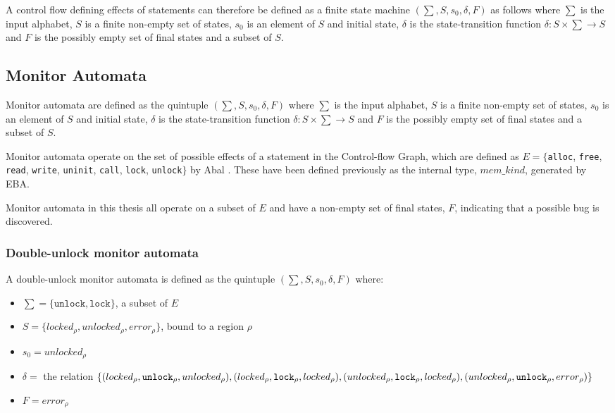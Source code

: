 \newpar A control flow defining effects of statements can therefore be defined as a finite state machine $(\sum, S, s_0, \delta, F)$ as follows where $\sum$ is the input alphabet, $S$ is a finite non-empty set of states, $s_0$ is an element of $S$ and initial state, $\delta$ is the state-transition function $\delta: S \times \sum \rightarrow S$ and $F$ is the possibly empty set of final states and a subset of $S$. 

\subsection{Monitor Automata}
Monitor automata are defined as the quintuple $(\sum, S, s_0, \delta, F)$ where $\sum$ is the input alphabet, $S$ is a finite non-empty set of states, $s_0$ is an element of $S$ and initial state, $\delta$ is the state-transition function $\delta: S \times \sum \rightarrow S$ and $F$ is the possibly empty set of final states and a subset of $S$.

\newpar Monitor automata operate on the set of possible effects of a statement in the Control-flow Graph, which are defined as $E = \{$\texttt{alloc}, \texttt{free}, \texttt{read}, \texttt{write}, \texttt{uninit}, \texttt{call}, \texttt{lock}, \texttt{unlock}$\}$ by Abal \cite{EffectiveBugFinding}. These have been defined previously as the internal type, $mem\_kind$, generated by EBA. 

\newpar Monitor automata in this thesis all operate on a subset of $E$ and have a non-empty set of final states, $F$, indicating that a possible bug is discovered.  

\subsubsection{Double-unlock monitor automata}

A double-unlock monitor automata is defined as the quintuple $(\sum, S, s_0, \delta, F)$ where: 

\begin{itemize}
    \item $\sum = \{\texttt{unlock}, \texttt{lock}\}$, a subset of $E$
    \item $S = \{ locked_\rho, unlocked_\rho, error_\rho \}$, bound to a region $\rho$
    \item $s_0 = unlocked_\rho$ 
    \item $\delta =$ the relation $\{(locked_\rho, \texttt{unlock}_\rho, unlocked_\rho), (locked_\rho, \texttt{lock}_\rho, locked_\rho), \\
        (unlocked_\rho, \texttt{lock}_\rho, locked_\rho), (unlocked_\rho, \texttt{unlock}_\rho, error_\rho)\}$ 
    \item $F = error_\rho$  
\end{itemize}


